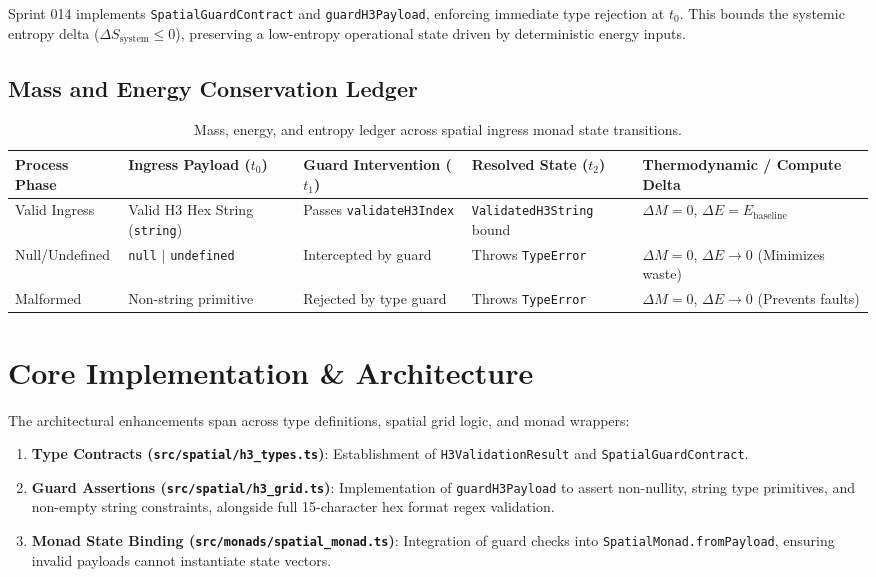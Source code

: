 \documentclass[11pt, a4paper]{article}
\begin{document}
Sprint 014 implements \texttt{SpatialGuardContract} and \texttt{guardH3Payload}, enforcing immediate type rejection at $t_0$. This bounds the systemic entropy delta ($\Delta S_{\text{system}} \leq 0$), preserving a low-entropy operational state driven by deterministic energy inputs.

\subsection{Mass and Energy Conservation Ledger}
\begin{table}[htbp]
\centering
\begin{tabular}{lllll}
\toprule
\textbf{Process Phase} & \textbf{Ingress Payload ($t_0$)} & \textbf{Guard Intervention ($t_1$)} & \textbf{Resolved State ($t_2$)} & \textbf{Thermodynamic / Compute Delta} \\
\midrule
Valid Ingress & Valid H3 Hex String (\texttt{string}) & Passes \texttt{validateH3Index} & \texttt{ValidatedH3String} bound & $\Delta M = 0$, $\Delta E = E_{\text{baseline}}$ \\
Null/Undefined & \texttt{null} $\vert$ \texttt{undefined} & Intercepted by guard & Throws \texttt{TypeError} & $\Delta M = 0$, $\Delta E \to 0$ (Minimizes waste) \\
Malformed & Non-string primitive & Rejected by type guard & Throws \texttt{TypeError} & $\Delta M = 0$, $\Delta E \to 0$ (Prevents faults) \\
\bottomrule
\end{tabular}
\caption{Mass, energy, and entropy ledger across spatial ingress monad state transitions.}
\label{tab:thermodynamic_ledger}
\end{table}

\section{Core Implementation \& Architecture}
The architectural enhancements span across type definitions, spatial grid logic, and monad wrappers:
\begin{enumerate}
    \item \textbf{Type Contracts (\texttt{src/spatial/h3\_types.ts})}: Establishment of \texttt{H3ValidationResult} and \texttt{SpatialGuardContract}.
    \item \textbf{Guard Assertions (\texttt{src/spatial/h3\_grid.ts})}: Implementation of \texttt{guardH3Payload} to assert non-nullity, string type primitives, and non-empty string constraints, alongside full 15-character hex format regex validation.
    \item \textbf{Monad State Binding (\texttt{src/monads/spatial\_monad.ts})}: Integration of guard checks into \texttt{SpatialMonad.fromPayload}, ensuring invalid payloads cannot instantiate state vectors.
\end{enumerate}
\end{document}
